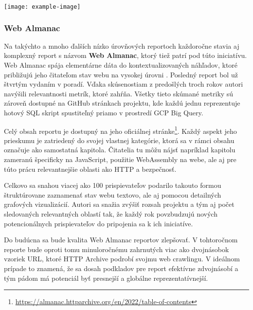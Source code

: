 \begin{center}
\noindent\texttt{[image: example-image]}    
\end{center}

\subsubsection{Web Almanac}
Na takýchto a mnoho ďalších nízko úrovňových reportoch každoročne stavia aj komplexný report s názvom \textbf{Web Almanac}, ktorý tiež patrí pod túto iniciatívu.
Web Almanac spája elementárne dáta do kontextualizovaných náhľadov, ktoré približujú jeho čitateľom stav webu na vysokej úrovni \cite{httparchive-methodology}.
Posledný report bol už štvrtým vydaním v poradí.
Vďaka skúsenostiam z predošlých troch rokov autori navýšili relevantnosti metrík, ktoré zahŕňa. 
Všetky tieto skúmané metriky sú zároveň dostupné na GitHub stránkach projektu, kde každú jednu reprezentuje hotový SQL skript spustiteľný priamo v prostredí GCP Big Query.

Celý obsah reportu je dostupný na jeho oficiálnej stránke\footnote{\href{https://almanac.httparchive.org/en/2022/table-of-contents}{https://almanac.httparchive.org/en/2022/table-of-contents}}. 
Každý aspekt jeho prieskumu je zatriedený do svojej vlastnej kategórie, ktorá sa v rámci obsahu označuje ako samostatná kapitola.
Čitatelia tu môžu nájsť napríklad kapitolu zameranú špecificky na JavaScript, použitie WebAssembly na webe, ale aj pre túto prácu relevantnejšie oblasti ako HTTP a bezpečnosť.

Celkovo sa snahou viacej ako 100 prispievateľov podarilo takouto formou štruktúrovane zaznamenať stav webu textovo, ale aj pomocou detailných grafových vizualizácií.
Autori sa snažia zvýšiť rozsah projektu a tým aj počet sledovaných relevantných oblastí tak, že každý rok povzbudzujú nových potencionálnych prispievateľov do pripojenia sa k ich iniciatíve. 

Do budúcna sa bude kvalita Web Almanac reportov zlepšovať. 
V tohtoročnom reporte bude oproti tomu minuloročnému zahrnutých viac ako dvojnásobok vzoriek URL, 
ktoré HTTP Archive podrobí svojmu web crawlingu.
V ideálnom prípade to znamená, že sa dosah podkladov pre report efektívne zdvojnásobí a tým pádom má potenciál byť presnejší a globálne reprezentatívnejší.

